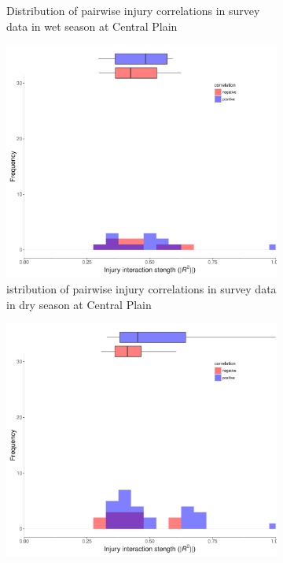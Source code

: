 \begin{figure}
\begin{subfigure}[b]{0.5\textwidth}
        \caption{Distribution of pairwise injury correlations in survey data in wet season at Central Plain}
        \label{fig:cortest2}
    \end{subfigure}
\begin{subfigure}[b]{0.5\textwidth}
        \includegraphics[width = 1\textwidth]{figures/combinedplotOD_ds.pdf}
        \caption{istribution of pairwise injury correlations in survey data in dry season at Central Plain}
        \label{fig:cortest3}
    \end{subfigure}
\begin{subfigure}[b]{0.5\textwidth}
        \includegraphics[width = 1\textwidth]{figures/combinedplotOD_ws.pdf}

\end{subfigure}
\end{figure}
